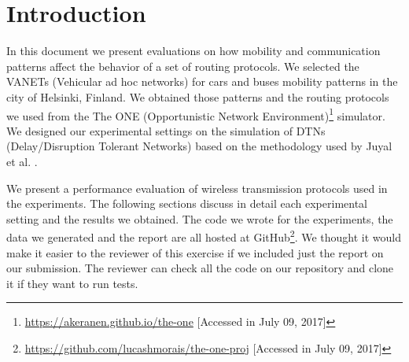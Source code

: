 \section{Introduction}

In this document we present evaluations on how mobility and communication
patterns affect the behavior of a set of routing protocols. We selected the
VANETs (Vehicular ad hoc networks) for cars and buses mobility patterns in the
city of Helsinki, Finland.  We obtained those patterns and the routing
protocols we used from the The ONE (Opportunistic Network
Environment)\footnote{\url{https://akeranen.github.io/the-one} [Accessed in
July 09, 2017]} simulator. We designed our experimental settings on the simulation of
DTNs (Delay/Disruption Tolerant Networks) based on the methodology used by
Juyal et al. \cite{juyal2015message}.

We present a performance evaluation of wireless transmission protocols used in
the experiments. The following sections discuss in detail each experimental
setting and the results we obtained. The code we wrote for the experiments, the
data we generated and the report are all hosted at
GitHub\footnote{\url{https://github.com/lucashmorais/the-one-proj} [Accessed in
July 09, 2017]}. We thought it would make it easier to the reviewer of this exercise
if we included just the report on our submission. The reviewer can check all the
code on our repository and clone it if they want to run tests.

